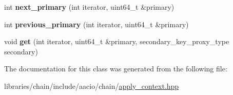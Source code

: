 \begin{DoxyCompactItemize}
\item 
\mbox{\label{classaacio_1_1chain_1_1apply__context_1_1generic__index_a342b75569a711099dc992aa6e5d214d5}} 
int {\bfseries next\+\_\+primary} (int iterator, uint64\+\_\+t \&primary)
\item 
\mbox{\label{classaacio_1_1chain_1_1apply__context_1_1generic__index_a827ef667c7c4c0e7681e34b57670f4ed}} 
int {\bfseries previous\+\_\+primary} (int iterator, uint64\+\_\+t \&primary)
\item 
\mbox{\label{classaacio_1_1chain_1_1apply__context_1_1generic__index_ac00cc26167a5b2653f1e85668bf41641}} 
void {\bfseries get} (int iterator, uint64\+\_\+t \&primary, secondary\+\_\+key\+\_\+proxy\+\_\+type secondary)
\end{DoxyCompactItemize}


The documentation for this class was generated from the following file\+:\begin{DoxyCompactItemize}
\item 
libraries/chain/include/aacio/chain/\mbox{\hyperlink{apply__context_8hpp}{apply\+\_\+context.\+hpp}}\end{DoxyCompactItemize}
